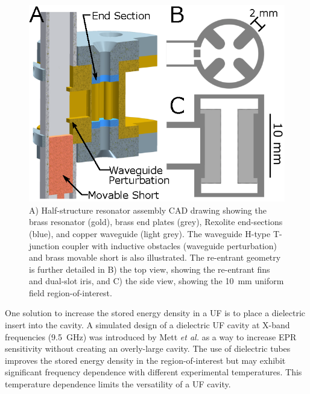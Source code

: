 \begin{figure}[htb]\centering
 \includegraphics{Kapitel/Ch2-Images/01-TE01UGeometry.eps}
 \caption[Resonator Assembly CAD Drawing.]{A) Half-structure resonator assembly CAD drawing showing the brass resonator (gold), brass end plates (grey), Rexolite end-sections (blue), and copper waveguide (light grey). The waveguide H-type T-junction coupler with inductive obstacles (waveguide perturbation) and brass movable short is also illustrated. The re-entrant geometry is further detailed in B) the top view, showing the re-entrant fins and dual-slot iris, and C) the side view, showing the 10~mm uniform field region-of-interest.}
 \label{Ch2-fig:GEO}
\end{figure}

One solution to increase the stored energy density in a UF \cylTE{} is to place a dielectric insert into the cavity. A simulated design of a dielectric UF cavity at X-band frequencies (9.5~GHz) was introduced by Mett \textit{et al.} as a way to increase EPR sensitivity without creating an overly-large cavity. \cite{HydeUFDR2017} The use of dielectric tubes improves the stored energy density in the region-of-interest but may exhibit significant frequency dependence with different experimental temperatures. \cite{Hartnett2003} This temperature dependence limits the versatility of a UF cavity. 


